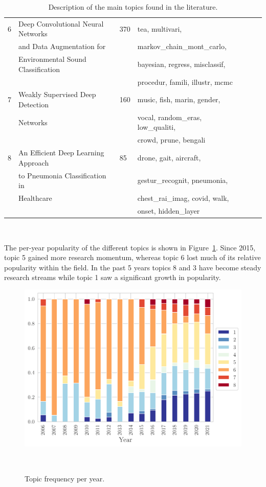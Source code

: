 \begin{table}
\begin{center}
\begin{tabular*}{\textwidth}{@{\extracolsep{\fill}}lllllll@{\extracolsep{\fill}}}
        6 & Deep Convolutional Neural Networks & 370 & tea, multivari, \\
          & and Data Augmentation for && markov\_chain\_mont\_carlo, \\
          & Environmental Sound Classification && bayesian, regress, misclassif, \\
        \vspace{.2cm}  &&& procedur, famili, illustr, mcmc \\
        
        7 & Weakly Supervised Deep Detection & 160 & music, fish, marin, gender, \\
          & Networks && vocal, random\_eras, low\_qualiti, \\
        \vspace{.2cm}  &&& crowd, prune, bengali \\
        
        8 & An Efficient Deep Learning Approach & 85 & drone, gait, aircraft, \\      
          & to Pneumonia Classification in && gestur\_recognit, pneumonia, \\
          & Healthcare && chest\_rai\_imag, covid, walk, \\
          &&& onset, hidden\_layer \\
        \bottomrule
    \end{tabular*}
    \caption{%
        Description of the main topics found in the literature.
    }~\label{tab:topic_analysis}
    \end{center}
\end{table}

The per-year popularity of the different topics is shown in
Figure~\ref{fig:topics_per_year}. Since 2015, topic 5 gained more research
momentum, whereas topic 6 lost much of its relative popularity within the
field. In the past 5 years topics 8 and 3 have become steady research streams
while topic 1 saw a significant growth in popularity. 

\begin{figure}
	\centering
    \includegraphics[width=.8\linewidth]{topics_per_year}
    \caption{Topic frequency per year.
    }~\label{fig:topics_per_year}
\end{figure}

